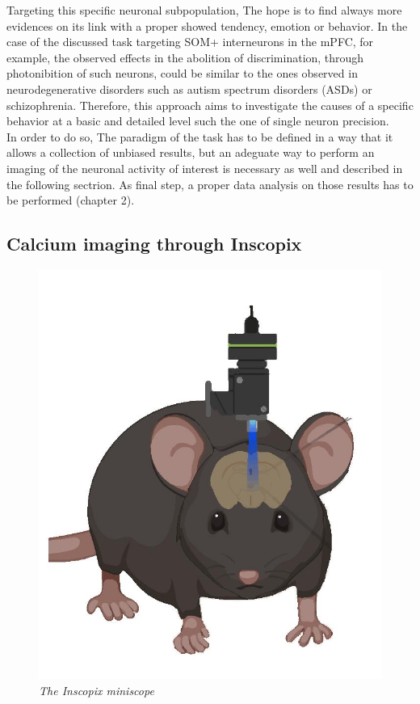 \documentclass[a4paper]{article}
\begin{document}
Targeting this specific neuronal subpopulation, The hope is to find always more evidences on its link with a proper showed tendency, emotion or behavior. In the case of the discussed task targeting SOM+ interneurons in the mPFC, for example, the observed effects in the abolition of discrimination, through photonibition of such neurons, could be similar to the ones observed in neurodegenerative disorders such as autism spectrum disorders (ASDs) or schizophrenia. Therefore, this approach aims to investigate the causes of a specific behavior at a basic and detailed level such the one of single neuron precision. \\
In order to do so, The paradigm of the task has to be defined in a way that it allows a collection of unbiased results, but an adeguate way to perform an imaging of the neuronal activity of interest is necessary as well and described in the following sectrion. As final step, a proper data analysis on those results has to be performed (chapter 2).

\newpage
\subsection{Calcium imaging through Inscopix}



\begin{figure}[H]
	\begin{center}
		\includegraphics[scale=.35]{Inscopix.jpg} 
	\end{center} 
	\caption{\textit{The Inscopix miniscope}}
	
\end{figure}
\end{document}

